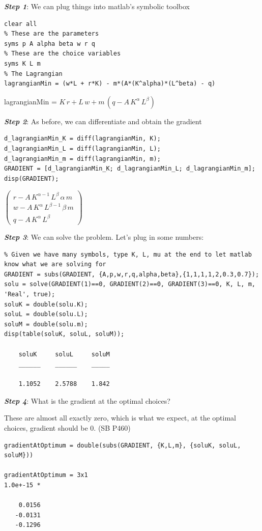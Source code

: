 \documentclass[
]{book}
\begin{document}
\textbf{\emph{Step 1}}: We can plug things into matlab's symbolic toolbox

\begin{verbatim}
clear all
% These are the parameters
syms p A alpha beta w r q
% These are the choice variables
syms K L m
% The Lagrangian
lagrangianMin = (w*L + r*K) - m*(A*(K^alpha)*(L^beta) - q)
\end{verbatim}

lagrangianMin =
\(\displaystyle K\,r+L\,w+m\,{\left(q-A\,K^{\alpha } \,L^{\beta } \right)}\)

\textbf{\emph{Step 2}}: As before, we can differentiate and obtain the gradient

\begin{verbatim}
d_lagrangianMin_K = diff(lagrangianMin, K);
d_lagrangianMin_L = diff(lagrangianMin, L);
d_lagrangianMin_m = diff(lagrangianMin, m);  
GRADIENT = [d_lagrangianMin_K; d_lagrangianMin_L; d_lagrangianMin_m];
disp(GRADIENT);
\end{verbatim}

\(\displaystyle \left(\begin{array}{c} r-A\,K^{\alpha -1} \,L^{\beta } \,\alpha \,m\\ w-A\,K^{\alpha } \,L^{\beta -1} \,\beta \,m\\ q-A\,K^{\alpha } \,L^{\beta } \end{array}\right)\)

\textbf{\emph{Step 3}}: We can solve the problem. Let's plug in some numbers:

\begin{verbatim}
% Given we have many symbols, type K, L, mu at the end to let matlab know what we are solving for
GRADIENT = subs(GRADIENT, {A,p,w,r,q,alpha,beta},{1,1,1,1,2,0.3,0.7});
solu = solve(GRADIENT(1)==0, GRADIENT(2)==0, GRADIENT(3)==0, K, L, m, 'Real', true);
soluK = double(solu.K);
soluL = double(solu.L);
soluM = double(solu.m);
disp(table(soluK, soluL, soluM));

    soluK     soluL     soluM
    ______    ______    _____

    1.1052    2.5788    1.842
\end{verbatim}

\textbf{\emph{Step 4}}: What is the gradient at the optimal choices?

These are almost all exactly zero, which is what we expect, at the
optimal choices, gradient should be 0. (SB P460)

\begin{verbatim}
gradientAtOptimum = double(subs(GRADIENT, {K,L,m}, {soluK, soluL, soluM}))

gradientAtOptimum = 3x1    
1.0e+-15 *

    0.0156
   -0.0131
   -0.1296
\end{verbatim}
\end{document}
